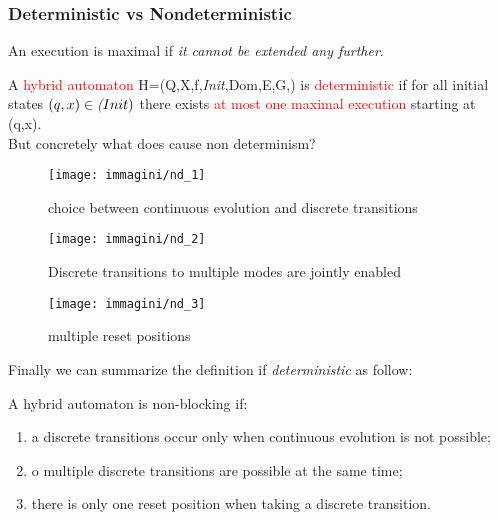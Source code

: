 \subsubsection{Deterministic vs Nondeterministic}
\begin{defn}
	An execution is maximal if \emph{it cannot be extended any further}.
\end{defn}
A \textcolor{red}{hybrid automaton} H=(Q,X,f,\textit{Init},Dom,E,G,) is \textcolor{red}{deterministic} if for all initial states $(q,x) \in \emph(Init)$ there exists \textcolor{red}{at most one maximal execution} starting at (q,x).\\
But concretely what does cause non determinism?

\begin{SCfigure}[][h]
	\centering
	\texttt{[image: immagini/nd\_1]}
	\caption{choice between continuous evolution and discrete transitions}
	\label{fig:nd_1}
\end{SCfigure}
\begin{SCfigure}[][h]	
	\texttt{[image: immagini/nd\_2]}
	\caption{Discrete transitions to multiple modes are jointly enabled}
	\label{fig:nd_2}
\end{SCfigure}
\begin{SCfigure}[][!h]	
	\texttt{[image: immagini/nd\_3]}
	\caption{multiple reset positions}
	\label{fig:nd_3}
\end{SCfigure}
 Finally we can summarize the definition if \emph{deterministic} as follow: 
\begin{tcolorbox}
	A hybrid automaton is non-blocking if:
	\begin{enumerate}
		\item a discrete transitions occur only when continuous evolution is not possible;
		\item o multiple discrete transitions are possible at the same time;
		\item there is only one reset position when taking a discrete transition.
	\end{enumerate}
\end{tcolorbox}
